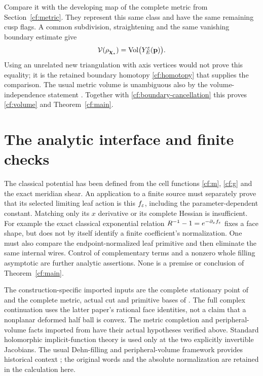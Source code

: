 Compare it with the developing map of the complete metric
from Section~\ref{cf:metric}. They represent this same class
and have the same remaining cusp flags. A common subdivision,
straightening and the same vanishing boundary estimate give
\[
 \mathcal V(\rho_{\boldsymbol\chi_*})
       =\operatorname{Vol}\bigl(Y^\varepsilon_E(\mathbf p)\bigr).
 \]
Using an unrelated new triangulation with axis vertices
would not prove this equality; it is the retained boundary
homotopy \eqref{cf:homotopy} that supplies the comparison.
The usual metric volume is unambiguous also by the
volume-independence statement \cite[Lemma~7.1]{Marked}.
Together with \eqref{cf:boundary-cancellation} this proves
\eqref{cf:volume} and Theorem~\ref{cf:main}.

\section{The analytic interface and finite checks}
\label{cf:interface}

The classical potential has been defined from the cell functions
\eqref{cf:m}, \eqref{cf:g} and the exact meridian shear.
An application to a finite source must separately prove that
its selected limiting leaf action is this $f_\varepsilon$, including
the parameter-dependent constant. Matching only its $x$
derivative or its complete Hessian is insufficient.
For example the exact classical exponential relation
$R^{-1}-1=e^{-\partial_x f_\varepsilon}$ fixes a face shape,
but does not by itself identify a finite coefficient's
normalization. One must also compare the endpoint-normalized
leaf primitive and then eliminate the same internal wires.
Control of complementary terms and a nonzero whole filling
asymptotic are further analytic assertions. None is a
premise or conclusion of Theorem~\ref{cf:main}.

The construction-specific imported inputs are the complete
stationary point of \cite[Proposition~5.3]{Newton} and the
complete metric, actual cut and primitive bases of
\cite[Theorem~1.2 and Sections~4--7]{Geometry}.
The full complex continuation uses the latter paper's
rational face identities, not a claim that a nonplanar
deformed half ball is convex. The metric completion and
peripheral-volume facts imported from \cite{Marked} have
their actual hypotheses verified above. Standard holomorphic
implicit-function theory is used only at the two explicitly
invertible Jacobians. The usual Dehn-filling and
peripheral-volume framework provides historical context
\cite{NeumannZagier}; the original words and the absolute
normalization are retained in the calculation here.

